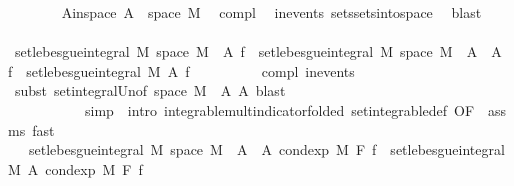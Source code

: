 \begin{isabellebody}
\ \ \ \ \ \ \isamarkupfalse%
\ A{\isacharunderscore}{\kern0pt}in{\isacharunderscore}{\kern0pt}space{\isacharcolon}{\kern0pt}\ {\isachardoublequoteopen}A\ {\isasymsubseteq}\ space\ M{\isachardoublequoteclose}\ \isamarkupfalse%
\ compl\ \isamarkupfalse%
\ in{\isacharunderscore}{\kern0pt}events\ sets{\isachardot}{\kern0pt}sets{\isacharunderscore}{\kern0pt}into{\isacharunderscore}{\kern0pt}space\ \isamarkupfalse%
\ blast\isanewline
\ \ \ \ \ \ \isamarkupfalse%
\ {\isachardoublequoteopen}set{\isacharunderscore}{\kern0pt}lebesgue{\isacharunderscore}{\kern0pt}integral\ M\ {\isacharparenleft}{\kern0pt}space\ M\ {\isacharminus}{\kern0pt}\ A{\isacharparenright}{\kern0pt}\ f\ {\isacharequal}{\kern0pt}\ set{\isacharunderscore}{\kern0pt}lebesgue{\isacharunderscore}{\kern0pt}integral\ M\ {\isacharparenleft}{\kern0pt}space\ M\ {\isacharminus}{\kern0pt}\ A\ {\isasymunion}\ A{\isacharparenright}{\kern0pt}\ f\ {\isacharminus}{\kern0pt}\ set{\isacharunderscore}{\kern0pt}lebesgue{\isacharunderscore}{\kern0pt}integral\ M\ A\ f{\isachardoublequoteclose}\isanewline
\ \ \ \ \ \ \ \ \isamarkupfalse%
\ compl{\isacharparenleft}{\kern0pt}{}{\isacharparenright}{\kern0pt}\ in{\isacharunderscore}{\kern0pt}events\isanewline
\ \ \ \ \ \ \ \ \isamarkupfalse%
\ {\isacharparenleft}{\kern0pt}subst\ set{\isacharunderscore}{\kern0pt}integral{\isacharunderscore}{\kern0pt}Un{\isacharbrackleft}{\kern0pt}of\ {\isachardoublequoteopen}space\ M\ {\isacharminus}{\kern0pt}\ A{\isachardoublequoteclose}\ A{\isacharbrackright}{\kern0pt}{\isacharcomma}{\kern0pt}\ blast{\isacharparenright}{\kern0pt}\isanewline
\ \ \ \ \ \ \ \ \ \ \ {\isacharparenleft}{\kern0pt}simp\ {\isacharbar}{\kern0pt}\ intro\ integrable{\isacharunderscore}{\kern0pt}mult{\isacharunderscore}{\kern0pt}indicator{\isacharbrackleft}{\kern0pt}folded\ set{\isacharunderscore}{\kern0pt}integrable{\isacharunderscore}{\kern0pt}def{\isacharcomma}{\kern0pt}\ OF\ {\isacharunderscore}{\kern0pt}\ assms{\isacharparenleft}{\kern0pt}{}{\isacharparenright}{\kern0pt}{\isacharbrackright}{\kern0pt}{\isacharcomma}{\kern0pt}\ fast{\isacharparenright}{\kern0pt}{\isacharplus}{\kern0pt}\isanewline
\ \ \ \ \ \ \isamarkupfalse%
\ \isamarkupfalse%
\ {\isachardoublequoteopen}{\isachardot}{\kern0pt}{\isachardot}{\kern0pt}{\isachardot}{\kern0pt}\ {\isacharequal}{\kern0pt}\ set{\isacharunderscore}{\kern0pt}lebesgue{\isacharunderscore}{\kern0pt}integral\ M\ {\isacharparenleft}{\kern0pt}space\ M\ {\isacharminus}{\kern0pt}\ A\ {\isasymunion}\ A{\isacharparenright}{\kern0pt}\ {\isacharparenleft}{\kern0pt}cond{\isacharunderscore}{\kern0pt}exp\ M\ F\ f{\isacharparenright}{\kern0pt}\ {\isacharminus}{\kern0pt}\ set{\isacharunderscore}{\kern0pt}lebesgue{\isacharunderscore}{\kern0pt}integral\ M\ A\ {\isacharparenleft}{\kern0pt}cond{\isacharunderscore}{\kern0pt}exp\ M\ F\ f{\isacharparenright}{\kern0pt}{\isachardoublequoteclose}\ \isanewline

\end{isabellebody}
